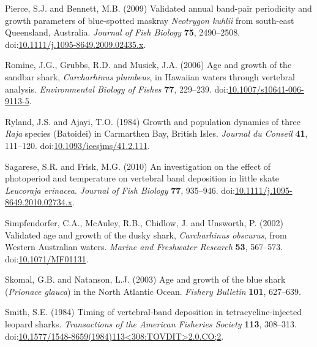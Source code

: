 \documentclass[]{article}
\begin{document}
\hypertarget{ref-pierce_validated_2009}{}
Pierce, S.J. and Bennett, M.B. (2009) Validated annual band-pair
periodicity and growth parameters of blue-spotted maskray
\emph{Neotrygon kuhlii} from south-east Queensland, Australia.
\emph{Journal of Fish Biology} \textbf{75}, 2490--2508.
doi:\href{https://doi.org/10.1111/j.1095-8649.2009.02435.x}{10.1111/j.1095-8649.2009.02435.x}.

\hypertarget{ref-romine_age_2006}{}
Romine, J.G., Grubbs, R.D. and Musick, J.A. (2006) Age and growth of the
sandbar shark, \emph{Carcharhinus plumbeus}, in Hawaiian waters through
vertebral analysis. \emph{Environmental Biology of Fishes} \textbf{77},
229--239.
doi:\href{https://doi.org/10.1007/s10641-006-9113-5}{10.1007/s10641-006-9113-5}.

\hypertarget{ref-ryland_growth_1984}{}
Ryland, J.S. and Ajayi, T.O. (1984) Growth and population dynamics of
three \emph{Raja} species (Batoidei) in Carmarthen Bay, British Isles.
\emph{Journal du Conseil} \textbf{41}, 111--120.
doi:\href{https://doi.org/10.1093/icesjms/41.2.111}{10.1093/icesjms/41.2.111}.

\hypertarget{ref-sagarese_investigation_2010}{}
Sagarese, S.R. and Frisk, M.G. (2010) An investigation on the effect of
photoperiod and temperature on vertebral band deposition in little skate
\emph{Leucoraja erinacea}. \emph{Journal of Fish Biology} \textbf{77},
935--946.
doi:\href{https://doi.org/10.1111/j.1095-8649.2010.02734.x}{10.1111/j.1095-8649.2010.02734.x}.

\hypertarget{ref-simpfendorfer_validated_2002}{}
Simpfendorfer, C.A., McAuley, R.B., Chidlow, J. and Unsworth, P. (2002)
Validated age and growth of the dusky shark, \emph{Carcharhinus
obscurus}, from Western Australian waters. \emph{Marine and Freshwater
Research} \textbf{53}, 567--573.
doi:\href{https://doi.org/10.1071/MF01131}{10.1071/MF01131}.

\hypertarget{ref-skomal_age_2003}{}
Skomal, G.B. and Natanson, L.J. (2003) Age and growth of the blue shark
(\emph{Prionace glauca}) in the North Atlantic Ocean. \emph{Fishery
Bulletin} \textbf{101}, 627--639.

\hypertarget{ref-smith_timing_1984}{}
Smith, S.E. (1984) Timing of vertebral-band deposition in
tetracycline-injected leopard sharks. \emph{Transactions of the American
Fisheries Society} \textbf{113}, 308--313.
doi:\href{https://doi.org/10.1577/1548-8659(1984)113\%3C308:TOVDIT\%3E2.0.CO;2}{10.1577/1548-8659(1984)113\textless{}308:TOVDIT\textgreater{}2.0.CO;2}.
\end{document}

